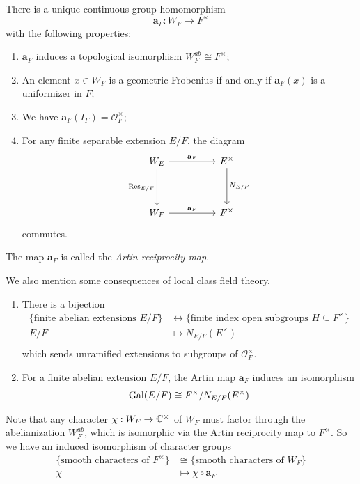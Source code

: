 \begin{thm}
	There is a unique continuous group homomorphism
	\[\mathbf{a}_F: W_F\to F^\times\]
	with the following properties:
	\begin{enumerate}
		\item $\mathbf{a}_F$ induces a topological isomorphism $W_F^{ab}\cong F^\times$;
		\item An element $x\in W_F$ is a geometric Frobenius if and only if $\mathbf{a}_F(x)$ is a uniformizer in $F$;
		\item We have $\mathbf{a}_F(I_F) = \mathcal{O}_F^\times$;
		\item For any finite separable extension $E/F$, the diagram 
		\[\begin{tikzcd}
			{W_E} && {E^\times} \\
			\\
			{W_F} && {F^\times}
			\arrow["{\mathbf{a}_E}", from=1-1, to=1-3]
			\arrow["{\Res_{E/F}}"', from=1-1, to=3-1]
			\arrow["{N_{E/F}}", from=1-3, to=3-3]
			\arrow["{\mathbf{a}_F}", from=3-1, to=3-3]
		\end{tikzcd}\]
		commutes.
	\end{enumerate}
	The map $\mathbf{a}_F$ is called the \emph{Artin reciprocity map}.
\end{thm}
We also mention some consequences of local class field theory.
\begin{cor}
	\begin{enumerate}
	\item There is a bijection
		\begin{align*}
			\{\text{finite abelian extensions $E/F$}\} &\leftrightarrow \{\text{finite index open subgroups $H\subseteq F^\times$}\}\\
				E/F &\mapsto N_{E/F}(E^\times)\\
		\end{align*}
		which sends unramified extensions to subgroups of $\mathcal{O}_F^\times$.
	\item For a finite abelian extension $E/F$, the Artin map $\mathbf{a}_F$ induces an isomorphism
		\[\mathrm{Gal}(E/F)\cong F^\times/N_{E/F}(E^\times)\]
	\end{enumerate}
\end{cor}
Note that any character $\chi: W_F\to \mathbb{C}^\times$ of $W_F$ must factor through the abelianization $W_F^{ab}$, which is isomorphic via the Artin reciprocity map to $F^\times$. So we have an induced isomorphism of character groups
\begin{align*}
	\{\text{smooth characters of }F^\times\} &\cong \{\text{smooth characters of }W_F\}\\
	\chi &\mapsto \chi\circ\mathbf{a}_F
\end{align*}
